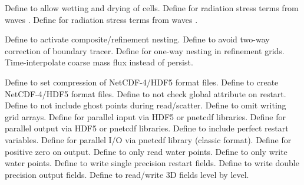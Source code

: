 \begin{klist}
\begin{klist}
     Define to allow wetting and drying of cells.
     Define for radiation stress terms from
    waves \citep{Mellor_2005}.
     Define for radiation stress terms from
    waves \citep{Mellor_2008}.
  \end{klist}
   \mbox{}
  \begin{klist}
      Define to activate composite/refinement nesting.
     Define to avoid two-way correction
  of boundary tracer.
     Define for one-way nesting in refinement grids.
     Time-interpolate coarse mass flux
  instead of persist.
  \end{klist}
   \mbox{}
  \begin{klist}
     Define to set compression of NetCDF-4/HDF5 format files.
     Define to create NetCDF-4/HDF5 format files.
     Define to not check  global
    attribute on restart.
     Define to not include ghost points during
    read/scatter.
     Define to omit writing grid arrays.
     Define for parallel input via HDF5 or pnetcdf
    libraries.
     Define for parallel output via HDF5 or pnetcdf
    libraries.
     Define to include perfect restart variables.
     Define for parallel I/O via pnetcdf library
    (classic format).
     Define for positive zero on output.
     Define to only read water points.
     Define to only write water points.
     Define to write single precision restart fields.
     Define to write double precision output fields.
     Define to read/write 3D fields level by level.
  \end{klist}
\end{klist}

